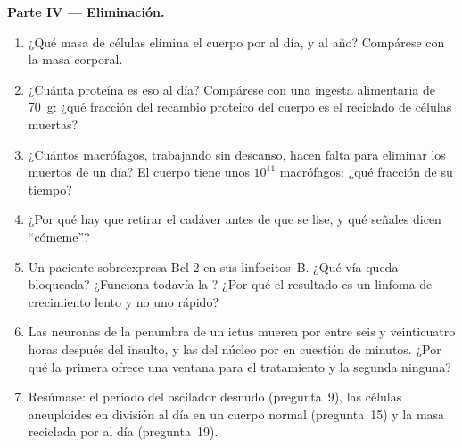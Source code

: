 \begin{problem}
\medskip
\noindent\textbf{Parte IV --- Eliminación.}
\begin{enumerate}[resume]
  \item ¿Qué masa de células elimina el cuerpo por  al día, y al
        año? Compárese con la masa corporal.
  \item ¿Cuánta proteína es eso al día? Compárese con una ingesta
        alimentaria de \qty{70}{g}: ¿qué fracción del recambio proteico
        del cuerpo es el reciclado de células muertas?
  \item ¿Cuántos macrófagos, trabajando sin descanso, hacen falta para
        eliminar los muertos de un día? El cuerpo tiene unos $10^{11}$
        macrófagos: ¿qué fracción de su tiempo?
  \item ¿Por qué hay que retirar el cadáver antes de que se lise, y qué
        señales dicen ``cómeme''?
  \item Un paciente sobreexpresa Bcl-2 en sus linfocitos~B. ¿Qué vía
        queda bloqueada? ¿Funciona todavía la ? ¿Por qué el
        resultado es un linfoma de crecimiento lento y no uno rápido?
  \item Las neuronas de la penumbra de un ictus mueren por 
        entre seis y veinticuatro horas después del insulto, y las del
        núcleo por  en cuestión de minutos. ¿Por qué la primera
        ofrece una ventana para el tratamiento y la segunda ninguna?
  \item Resúmase: el período del oscilador desnudo (pregunta~9), las
        células aneuploides en división al día en un cuerpo normal
        (pregunta~15) y la masa reciclada por  al día
        (pregunta~19).
\end{enumerate}
\end{problem}
